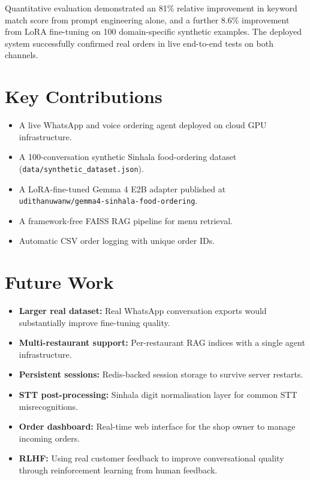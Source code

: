 \documentclass[12pt,a4paper]{report}
\begin{document}
Quantitative evaluation demonstrated an 81\% relative improvement in keyword match score from prompt engineering alone, and a further 8.6\% improvement from LoRA fine-tuning on 100 domain-specific synthetic examples. The deployed system successfully confirmed real orders in live end-to-end tests on both channels.

\section{Key Contributions}
\begin{itemize}
    \item A live WhatsApp and voice ordering agent deployed on cloud GPU infrastructure.
    \item A 100-conversation synthetic Sinhala food-ordering dataset (\texttt{data/synthetic\_dataset.json}).
    \item A LoRA-fine-tuned Gemma 4 E2B adapter published at \texttt{udithanuwanw/gemma4-sinhala-food-ordering}.
    \item A framework-free FAISS RAG pipeline for menu retrieval.
    \item Automatic CSV order logging with unique order IDs.
\end{itemize}

\section{Future Work}
\begin{itemize}
    \item \textbf{Larger real dataset:} Real WhatsApp conversation exports would substantially improve fine-tuning quality.
    \item \textbf{Multi-restaurant support:} Per-restaurant RAG indices with a single agent infrastructure.
    \item \textbf{Persistent sessions:} Redis-backed session storage to survive server restarts.
    \item \textbf{STT post-processing:} Sinhala digit normalisation layer for common STT misrecognitions.
    \item \textbf{Order dashboard:} Real-time web interface for the shop owner to manage incoming orders.
    \item \textbf{RLHF:} Using real customer feedback to improve conversational quality through reinforcement learning from human feedback.
\end{itemize}
\end{document}

